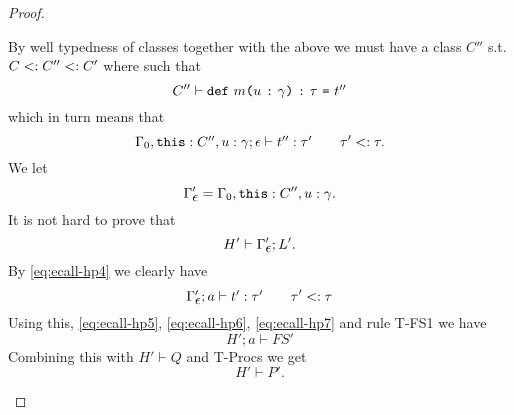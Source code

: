 \begin{proof}
\begin{description}
\begin{description}
          By well typedness of classes together with the above we must have a
          class $C''$ s.t. $C <: C'' <: C'$ where such that
          \begin{equation}
            C'' \vdash \mbox{\texttt{def}~$m$\texttt{(}$u$~\texttt{:}~$\gamma$\texttt{)}~\texttt{:}~$\tau$~\texttt{=}~$t''$}
          \end{equation}
          which in turn means that
          \begin{equation} \label{eq:ecall-hp4}
            \mbox{$\Gamma_0,\mbox{\texttt{this}}: C'', u: \gamma;\mbox{$\epsilon$}\vdash t'':\tau'$}
            \quad\quad \tau' <: \tau.
          \end{equation}
          We let
          \begin{equation}
            \Gamma_{\mbox{$\epsilon$}}' = \Gamma_0, \mbox{\texttt{this}}: C'', u: \gamma.
          \end{equation}
          It is not hard to prove that 
          \begin{equation} \label{eq:ecall-hp7}
            H' \vdash \Gamma_{\mbox{$\epsilon$}}'; L'.
          \end{equation}
          By \eqref{eq:ecall-hp4} we clearly have
          \begin{equation}
            \mbox{$\Gamma_{\mbox{$\epsilon$}}';a\vdash t':\tau'$} \quad\quad \tau' <: \tau
          \end{equation}
          Using this, \eqref{eq:ecall-hp5}, \eqref{eq:ecall-hp6},
          \eqref{eq:ecall-hp7} and rule {\sc
          T-FS1} we have
          \begin{equation}
            H';a \vdash FS'
          \end{equation}
          Combining this with $H' \vdash Q$ and {\sc T-Procs} we get
          \begin{equation}
            H' \vdash P'.
          \end{equation}


\end{description}
\end{description}
\end{proof}
